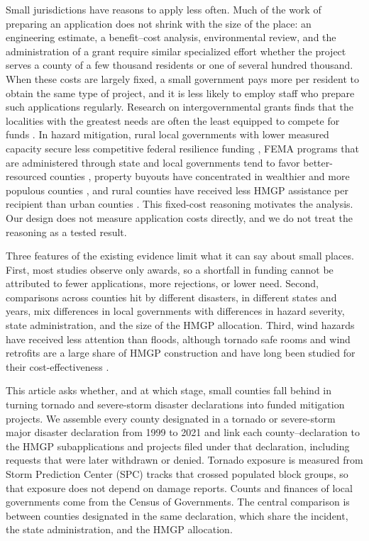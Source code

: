 Small jurisdictions have reasons to apply less often. Much of the work of preparing an application does not shrink with the size of the place: an engineering estimate, a benefit--cost analysis, environmental review, and the administration of a grant require similar specialized effort whether the project serves a county of a few thousand residents or one of several hundred thousand. When these costs are largely fixed, a small government pays more per resident to obtain the same type of project, and it is less likely to employ staff who prepare such applications regularly. Research on intergovernmental grants finds that the localities with the greatest needs are often the least equipped to compete for funds \parencite{collins2006redistributive,hall2008grant}. In hazard mitigation, rural local governments with lower measured capacity secure less competitive federal resilience funding \parencite{smith2025rural}, FEMA programs that are administered through state and local governments tend to favor better-resourced counties \parencite{miao2025equity}, property buyouts have concentrated in wealthier and more populous counties \parencite{mach2019buyouts}, and rural counties have received less HMGP assistance per recipient than urban counties \parencite{seong2022naturally}. This fixed-cost reasoning motivates the analysis. Our design does not measure application costs directly, and we do not treat the reasoning as a tested result.

Three features of the existing evidence limit what it can say about small places. First, most studies observe only awards, so a shortfall in funding cannot be attributed to fewer applications, more rejections, or lower need. Second, comparisons across counties hit by different disasters, in different states and years, mix differences in local governments with differences in hazard severity, state administration, and the size of the HMGP allocation. Third, wind hazards have received less attention than floods, although tornado safe rooms and wind retrofits are a large share of HMGP construction and have long been studied for their cost-effectiveness \parencite{simmons2006shelters}.

This article asks whether, and at which stage, small counties fall behind in turning tornado and severe-storm disaster declarations into funded mitigation projects. We assemble every county designated in a tornado or severe-storm major disaster declaration from 1999 to 2021 and link each county--declaration to the HMGP subapplications and projects filed under that declaration, including requests that were later withdrawn or denied. Tornado exposure is measured from Storm Prediction Center (SPC) tracks that crossed populated block groups, so that exposure does not depend on damage reports. Counts and finances of local governments come from the Census of Governments. The central comparison is between counties designated in the same declaration, which share the incident, the state administration, and the HMGP allocation.

